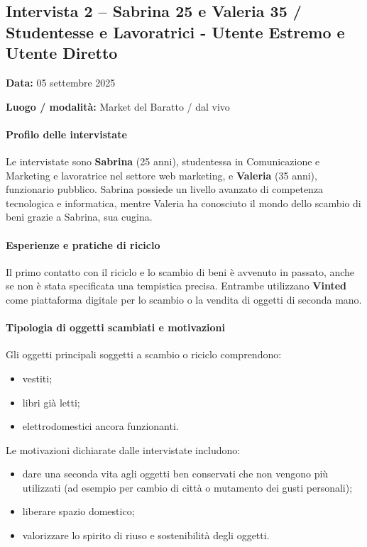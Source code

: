 \documentclass[12pt,a4paper]{article}
\begin{document}
\newpage

\subsection{Intervista 2 – Sabrina 25 e Valeria 35 / Studentesse e Lavoratrici - Utente Estremo e Utente Diretto}

\textbf{Data:} 05 settembre 2025  


\textbf{Luogo / modalità:} Market del Baratto / dal vivo 

\paragraph{Profilo delle intervistate}

Le intervistate sono \textbf{Sabrina} (25 anni), studentessa in Comunicazione e Marketing e lavoratrice nel settore web marketing, e \textbf{Valeria} (35 anni), funzionario pubblico.  
Sabrina possiede un livello avanzato di competenza tecnologica e informatica, mentre Valeria ha conosciuto il mondo dello scambio di beni grazie a Sabrina, sua cugina.

\paragraph{Esperienze e pratiche di riciclo}

Il primo contatto con il riciclo e lo scambio di beni è avvenuto in passato, anche se non è stata specificata una tempistica precisa. Entrambe utilizzano \textbf{Vinted} come piattaforma digitale per lo scambio o la vendita di oggetti di seconda mano.

\paragraph{Tipologia di oggetti scambiati e motivazioni}

Gli oggetti principali soggetti a scambio o riciclo comprendono:
\begin{itemize}
  \item vestiti;
  \item libri già letti;
  \item elettrodomestici ancora funzionanti.
\end{itemize}

Le motivazioni dichiarate dalle intervistate includono:
\begin{itemize}
  \item dare una seconda vita agli oggetti ben conservati che non vengono più utilizzati (ad esempio per cambio di città o mutamento dei gusti personali);
  \item liberare spazio domestico;
  \item valorizzare lo spirito di riuso e sostenibilità degli oggetti.
\end{itemize}
\end{document}
